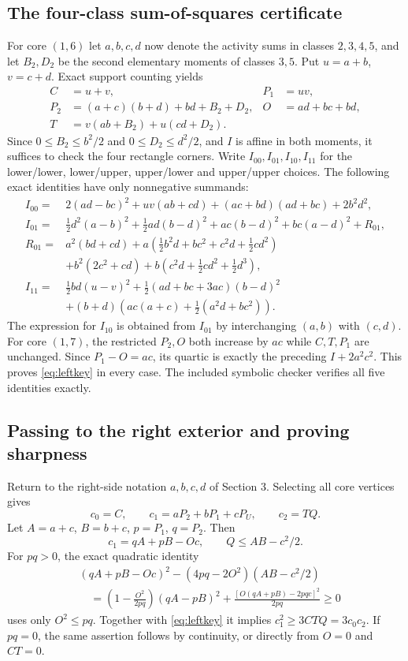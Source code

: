 \subsection{The four-class sum-of-squares certificate}
For core $(1,6)$ let $a,b,c,d$ now denote the activity sums in classes $2,3,4,5$, and let $B_2,D_2$ be the second elementary moments of classes $3,5$. Put $u=a+b$, $v=c+d$. Exact support counting yields
\begin{align*}
 C&=u+v,& P_1&=uv,\\
 P_2&=(a+c)(b+d)+bd+B_2+D_2,& O&=ad+bc+bd,\\
 T&=v(ab+B_2)+u(cd+D_2).
\end{align*}
Since $0\le B_2\le b^2/2$ and $0\le D_2\le d^2/2$, and $I$ is affine in both moments, it suffices to check the four rectangle corners. Write $I_{00},I_{01},I_{10},I_{11}$ for the lower/lower, lower/upper, upper/lower and upper/upper choices. The following exact identities have only nonnegative summands:
\begin{align*}
 I_{00}={}&2(ad-bc)^2+uv(ab+cd)+(ac+bd)(ad+bc)+2b^2d^2,\\
 I_{01}={}&\tfrac12d^2(a-b)^2+\tfrac12ad(b-d)^2
          +ac(b-d)^2+bc(a-d)^2+R_{01},\\
 R_{01}={}&a^2(bd+cd)
 +a\left(\tfrac12b^2d+bc^2+c^2d+\tfrac12cd^2\right)\\
 &+b^2(2c^2+cd)+b\left(c^2d+\tfrac12cd^2+\tfrac12d^3\right),\\
 I_{11}={}&\tfrac12bd(u-v)^2+\tfrac12(ad+bc+3ac)(b-d)^2\\
 &+(b+d)\left(ac(a+c)+\tfrac12(a^2d+bc^2)\right).
\end{align*}
The expression for $I_{10}$ is obtained from $I_{01}$ by interchanging $(a,b)$ with $(c,d)$. For core $(1,7)$, the restricted $P_2,O$ both increase by $ac$ while $C,T,P_1$ are unchanged. Since $P_1-O=ac$, its quartic is exactly the preceding $I+2a^2c^2$. This proves \eqref{eq:leftkey} in every case. The included symbolic checker verifies all five identities exactly.

\subsection{Passing to the right exterior and proving sharpness}
Return to the right-side notation $a,b,c,d$ of Section 3. Selecting all core vertices gives
\[
 c_0=C,\qquad c_1=aP_2+bP_1+cP_U,\qquad c_2=TQ.
\]
Let $A=a+c$, $B=b+c$, $p=P_1$, $q=P_2$. Then
\[
 c_1=qA+pB-Oc,\qquad Q\le AB-c^2/2.
\]
For $pq>0$, the exact quadratic identity
\begin{align*}
 &(qA+pB-Oc)^2-(4pq-2O^2)(AB-c^2/2)\\
 &\quad=\left(1-\frac{O^2}{2pq}\right)(qA-pB)^2
 +\frac{[O(qA+pB)-2pqc]^2}{2pq}\ge0
\end{align*}
uses only $O^2\le pq$. Together with \eqref{eq:leftkey} it implies $c_1^2\ge3CTQ=3c_0c_2$. If $pq=0$, the same assertion follows by continuity, or directly from $O=0$ and $CT=0$.

